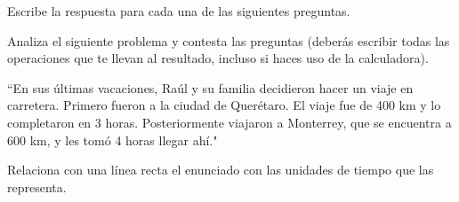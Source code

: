 \documentclass[11pt,addpoints]{exam}
\begin{document}

\begin{questions}
  \question[18] Escribe la respuesta para cada una de las siguientes preguntas.
  \begin{parts}
    
    
    
  \end{parts}

  \question[18] Analiza el siguiente problema y contesta las preguntas (deber\'as escribir todas las operaciones que te llevan al resultado, incluso si haces uso de la calculadora).

  \begin{center}
    \begin{minipage}[c]{\linewidth}
      ``En sus últimas vacaciones, Raúl y su familia decidieron hacer un viaje en carretera.
      Primero fueron a la ciudad de Quer\'etaro. El viaje fue de 400 km y lo completaron en 3 horas.
      Posteriormente viajaron a Monterrey, que se encuentra a 600 km, y les tomó 4 horas llegar ahí."
    \end{minipage}
  \end{center}
  \begin{parts}
    
    
    
  \end{parts}
\newpage
  \question[18] Relaciona con una l\'inea recta el {\color{cadmiumgreen}enunciado} con las unidades de  {\color{cadmiumorange}tiempo}   que las representa.

\begin{minipage}{0.6\linewidth}
\end{minipage}
\end{questions}
\end{document}
